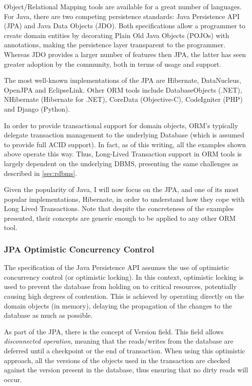 \documentclass{llncs}
\begin{document}
Object/Relational Mapping tools are available for a great number of
languages. For Java, there are two competing persistence standards:
Java Persistence API (JPA) and Java Data Objects (JDO). Both
specifications allow a programmer to create domain entities by
decorating Plain Old Java Objects (POJOs) with annotations, making the
persistence layer transparent to the programmer. Whereas JDO provides
a larger number of features then JPA, the latter has seen greater
adoption by the community, both in terms of usage and support.

The most well-known implementations of the JPA are Hibernate,
DataNucleus, OpenJPA and EclipseLink. Other ORM tools include
DatabaseObjects (.NET), NHibernate (Hibernate for .NET), CoreData
(Objective-C), CodeIgniter (PHP) and Django (Python).

In order to provide transactional support for domain objects, ORM's
typically delegate transaction management to the underlying Database
(which is assumed to provide full ACID support). In fact, as of this
writing, all the examples shown above operate this way. Thus,
Long-Lived Transaction support in ORM tools is largely dependent on
the underlying DBMS, presenting the same challenges as described in
\ref{sec:rdbms}.

Given the popularity of Java, I will now focus on the JPA, and one of
its most popular implementations, Hibernate, in order to understand
how they cope with Long Lived Transactions. Note that despite the
concreteness of the examples presented, their concepts are generic
enough to be applied to any other ORM tool.

\subsubsection{JPA Optimistic Concurrency Control}

The specification of the Java Persistence API assumes the use of
optimistic concurrency control (or optimistic locking). In this
context, optimistic locking is used to prevent the database from
holding on to critical resources, potentially causing high degrees of
contention.  This is achieved by operating directly on the domain
objects (in memory), delaying the propagation of the changes to the
database as much as possible.

As part of the JPA, there is the concept of Version field. This field
allows {\it disconnected operation}, meaning that the reads/writes
from the database are deferred until a checkpoint or the end of
transaction. When using this optimistic approach, all the versions of
the objects used in the transaction are checked against the version
present in the database, thus ensuring that no dirty reads will occur.
\end{document}
